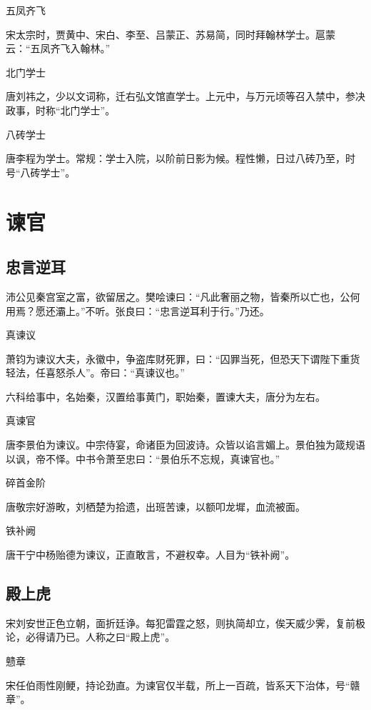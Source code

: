 \documentclass[a4paper,12pt,UTF8,twoside]{ctexbook}
\begin{document}
    五凤齐飞
    
    宋太宗时，贾黄中、宋白、李至、吕蒙正、苏易简，同时拜翰林学士。扈蒙云：“五凤齐飞入翰林。”
    
    北门学士
    
    唐刘祎之，少以文词称，迁右弘文馆直学士。上元中，与万元顷等召入禁中，参决政事，时称“北门学士”。
    
    八砖学士
    
    唐李程为学士。常规：学士入院，以阶前日影为候。程性懒，日过八砖乃至，时号“八砖学士”。
    
    \chapter{谏官}
    
    \section{忠言逆耳}
    
    沛公见秦宫室之富，欲留居之。樊哙谏曰：“凡此奢丽之物，皆秦所以亡也，公何用焉？愿还灞上。”不听。张良曰：“忠言逆耳利于行。”乃还。
    
    真谏议
    
    萧钧为谏议大夫，永徽中，争盗库财死罪，曰：“囚罪当死，但恐天下谓陛下重货轻法，任喜怒杀人”。帝曰：“真谏议也。”
    
    六科给事中，名始秦，汉置给事黄门，职始秦，置谏大夫，唐分为左右。
    
    真谏官
    
    唐李景伯为谏议。中宗侍宴，命诸臣为回波诗。众皆以谄言媚上。景伯独为箴规语以讽，帝不怿。中书令萧至忠曰：“景伯乐不忘规，真谏官也。”
    
    碎首金阶
    
    唐敬宗好游畋，刘栖楚为拾遗，出班苦谏，以额叩龙墀，血流被面。
    
    铁补阙
    
    唐干宁中杨贻德为谏议，正直敢言，不避权幸。人目为“铁补阙”。
    
    \section{殿上虎}
    
    宋刘安世正色立朝，面折廷诤。每犯雷霆之怒，则执简却立，俟天威少霁，复前极论，必得请乃已。人称之曰“殿上虎”。
    
    戆章
    
    宋任伯雨性刚鲠，持论劲直。为谏官仅半载，所上一百疏，皆系天下治体，号“赣章”。
    
\end{document}
